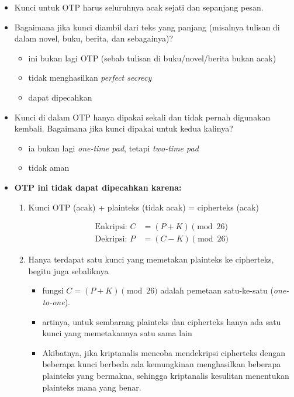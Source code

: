 \documentclass{article}
\begin{document}
\begin{itemize}
    \item Kunci untuk OTP harus seluruhnya acak sejati dan sepanjang pesan.
    \item Bagaimana jika kunci diambil dari teks yang panjang (misalnya tulisan di dalam novel, buku, berita, dan sebagainya)?
    \begin{itemize}
        \item ini bukan lagi OTP (sebab tulisan di buku/novel/berita bukan acak)
        \item tidak menghasilkan \textit{perfect secrecy}
        \item dapat dipecahkan
    \end{itemize}
    \item Kunci di dalam OTP hanya dipakai sekali dan tidak pernah digunakan kembali. Bagaimana jika kunci dipakai untuk kedua kalinya?
    \begin{itemize}
        \item ia bukan lagi \textit{one-time pad}, tetapi \textit{two-time pad}
        \item tidak aman
    \end{itemize}
\end{itemize}

\newpage


\begin{itemize}
    \item[$\bullet$] \textbf{OTP ini tidak dapat dipecahkan karena:}
    \begin{enumerate}
        \item Kunci OTP (acak) + plainteks (tidak acak) = cipherteks (acak)
        
        \begin{align*}
            \text{Enkripsi: } C &= (P + K) \pmod{26} \\ 
            \text{Dekripsi: } P &= (C - K) \pmod{26}
        \end{align*}
        
        \item Hanya terdapat satu kunci yang memetakan plainteks ke cipherteks, begitu juga sebaliknya
        \begin{itemize}
            \item[$\rightarrow$] fungsi $C = (P + K) \pmod{26}$ adalah pemetaan satu-ke-satu (\textit{one-to-one}).
            \item[$\rightarrow$] artinya, untuk sembarang plainteks dan cipherteks hanya ada satu kunci yang memetakannya satu sama lain
            \item[$\rightarrow$] Akibatnya, jika kriptanalis mencoba mendekripsi cipherteks dengan beberapa kunci berbeda ada kemungkinan menghasilkan beberapa plainteks yang bermakna, sehingga kriptanalis kesulitan menentukan plainteks mana yang benar.
        \end{itemize}
    \end{enumerate}
\end{itemize}
\end{document}
